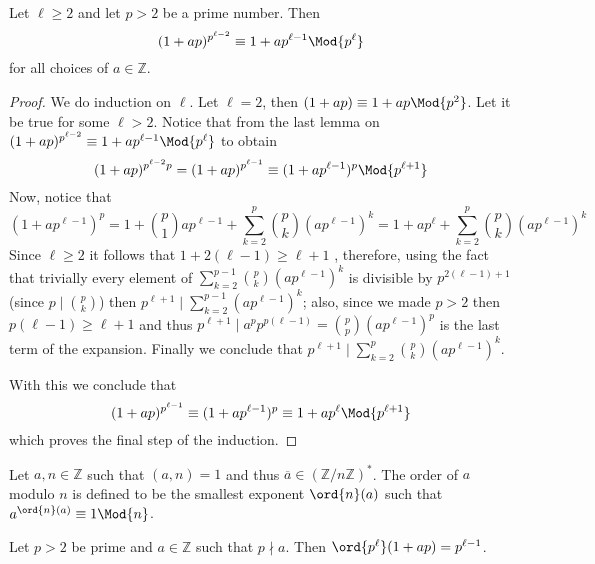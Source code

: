 \begin{corollary}
   Let \(\ell \geqslant 2\) and let \(p > 2\) be a prime number. Then
    \[
       (1+ap)^{p^{\ell-2}} \equiv 1 + a p^{\ell-1} \Mod{p^\ell}
   \] 
   for all choices of \(a \in \mathbb{Z}\).
\end{corollary}

\begin{proof}
   We do induction on \(\ell\). Let  \(\ell = 2\), then  \((1 + ap) \equiv 1 +
   ap \Mod{p^2}\). Let it be true for some \(\ell > 2\). Notice that from the
   last lemma on \((1+ap)^{p^{\ell-2}} \equiv 1 + ap^{\ell-1} \Mod{p^\ell}\) to
   obtain  
   \[
      (1+ap)^{p^{\ell-2}p} = (1 + ap)^{p^{\ell-1}} \equiv (1 +
      ap^{\ell-1})^p \Mod{p^{\ell+1}}
   \]
   Now, notice that 
   \[
      (1 + ap^{\ell-1})^{p}
      = 1 + \binom{p}{1} ap^{\ell-1} + \sum_{k=2}^p \binom{p}{k} (ap^{\ell-1})^{k}
      = 1 + ap^{\ell} + \sum_{k=2}^{p} \binom{p}{k} (ap^{\ell-1})^k
   \]
   Since \(\ell \geqslant 2\) it follows that  \(1 + 2(\ell - 1) \geqslant
   \ell + 1\) , therefore, using the fact that trivially every element of
   \(\sum_{k=2}^{p-1} \binom{p}{k} (ap^{\ell-1})^k\) is divisible by \(p^{2(\ell
   - 1) + 1}\) (since \(p \mid \binom{p}{k}\)) then \(p^{\ell + 1} \mid
   \sum_{k=2}^{p-1} (ap^{\ell-1})^k\); also, since we made \(p > 2\) then
   \(p(\ell-1) \geqslant \ell+1\) and thus \(p^{\ell+1} \mid a^p p^{p(\ell-1)} =
   \binom{p}{p} (ap^{\ell-1})^p\) is the last term of the expansion. Finally we
   conclude that \(p^{\ell+1} \mid \sum_{k=2}^p \binom{p}{k} (a p^{\ell-1})^k\). 

   With this we conclude that 
   \[
      (1 + ap)^{p^{\ell-1}} \equiv (1 + ap^{\ell-1})^p \equiv 1 + ap^\ell
      \Mod{p^{\ell+1}}
   \] 
   which proves the final step of the induction.
\end{proof}

\begin{definition}[Order]
   Let \(a, n \in \mathbb{Z}\) such that \((a, n) = 1\) and thus  \(\overline{a}
   \in (\mathbb{Z}/n\mathbb{Z})^\ast\). The order of \(a\) modulo \(n\) is
   defined to be the smallest exponent  \(\ord{n}(a)\) such that
   \(a^{\ord{n}(a)} \equiv 1 \Mod{n}\).
\end{definition}

\begin{corollary}\label{cor2Cyclic}
   Let \(p > 2\) be prime and \(a \in \mathbb{Z}\) such that \(p \nmid a\). Then
   \(\ord{p^\ell}(1+ap) = p^{\ell-1}\).
\end{corollary}

